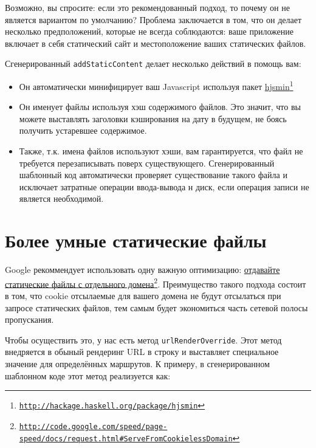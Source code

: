\begin{remark}
Возможно, вы спросите: если это рекомендованный подход, то почему он не является вариантом по умолчанию? Проблема заключается в том, что он делает несколько предположений, которые не всегда соблюдаются: ваше приложение включает в себя статический сайт и местоположение ваших статических файлов.
\end{remark}

Сгенерированный \lstinline!addStaticContent! делает несколько действий в помощь вам:
\begin{itemize}
  \item Он автоматически минифицирует ваш Javascript используя пакет \href{http://hackage.haskell.org/package/hjsmin}{hjsmin}\footnote{\href{http://hackage.haskell.org/package/hjsmin}{\texttt{http://hackage.haskell.org/package/hjsmin}}}
  \item Он именует файлы используя хэш содержимого файлов. Это значит, что вы можете выставлять заголовки кэширования на дату в будущем, не боясь получить устаревшее содержимое.
  \item Также, т.к. имена файлов используют хэши, вам гарантируется, что файл не требуется перезаписывать поверх существующего. Сгенерированный шаблонный код автоматически проверяет существование такого файла и исключает затратные операции ввода-вывода н диск, если операция записи не является необходимой.
\end{itemize}

\section {Более умные статические файлы}

Google рекоммендует использовать одну важную оптимизацию: \href{http://code.google.com/speed/page-speed/docs/request.html\#ServeFromCookielessDomain}{отдавайте статические файлы с отдельного домена}\footnote{\href{http://code.google.com/speed/page-speed/docs/request.html\#ServeFromCookielessDomain}{\texttt{http://code.google.com/speed/page-speed/docs/request.html\#ServeFromCookielessDomain}}}. Преимущество такого подхода состоит в том, что cookie отсылаемые для вашего домена не будут отсылаться при запросе статических файлов, тем самым будет экономиться часть сетевой полосы пропускания.

Чтобы осуществить это, у нас есть метод \lstinline!urlRenderOverride!. Этот метод внедряется в обыный рендеринг URL в строку и выставляет специальное значение для определённых маршрутов. К примеру, в сгенерированном шаблонном коде этот метод реализуется как:

